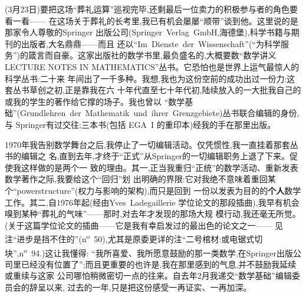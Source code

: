 
(3月23日)要把这场“葬礼运算”巡视完毕,还剩最后一位卖力的积极参与者的角色要看一看——
在这场关于葬礼的长考里,我已有机会屡屡“顺带”谈到他。这里说的是那家令人尊敬的Springer
出版公司(Springer~Verlag~GmbH,海德堡),科学书籍与期刊的出版者,大名鼎鼎——而且
还以“Im~Dienste~der~Wissenschaft”(“为科学服务”)的箴言而自豪。这家出版社的数学书里,最负盛名的,大概要数“数学讲义
LECTURE NOTES IN MATHEMATICS”丛书。它恐怕也是世界上运气\dmark{}最惊人的科学丛书:二十来
年间出了一千多种。我想,我也为这份空前的成功出过一份力:这套丛书草创之初,正是靠我在六
十年代直至七十年代初,陆续放入的一大批我自己的或我的学生的著作给它撑的场子。我也曾以
“数学基础”(Grundlehren~der~Mathematik~und~ihrer~Grenzgebiete)丛书联合编辑的身份,与
Springer有过交往;三本书(包括 EGA~I 的重印本)经我的手在那里出版。

1970年我告别数学舞台之后,我停止了一切编辑活动。仅凭惯性,我一直挂着那套丛书的编辑之
名,直到去年,才终于“正式”从Springer的一切编辑职务上退了下来。促使我这样做的是两个一
致的理由。其一,正当我重归“正统”的数学活动、重新发表数学著作之际,我要给这个“回归”划
出明确的界限:它对我绝不意味着重回某个“powerstructure”(权力与影响的架构),而只是回到
一份以发表为目的的\textbf{个人}数学工作。其二,自1976年起(经由Yves~Ladegaillerie
学位论文的那段插曲),我早有机会嗅到某种“葬礼的气味”——那时,对去年才发现的那场大规
模行动,我还毫无所觉。(关于这篇学位论文的插曲——它是我有幸启发过的最出色的论文之一——
见注“进步是挡不住的”(n\textsuperscript{o}~50),尤其是原委更详的注“二号棺材:或电锯式切块”,n\textsuperscript{o}~94.)这让我懂得:
“我所喜爱、我所愿意鼓励的那一类数学,在Springer出版公司里已经没有位置了”;而且更重要的也许是,我在那里感到的气息\dmark{},并不鼓励我延续或重续与这家
公司哪怕稍微密切一点的往来。自去年2月我递交“数学基础”编辑委员会的辞呈以来,
过去的一年,只是把这份感受一再证实、一再加深。

